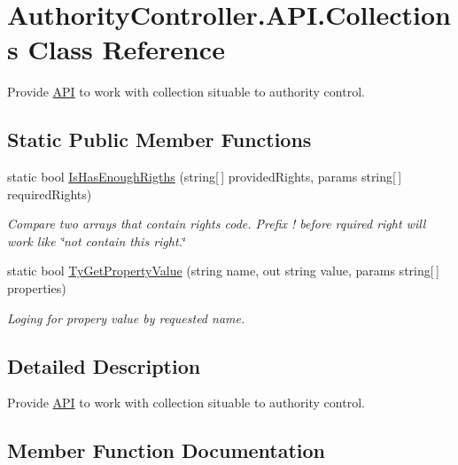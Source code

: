 \hypertarget{class_authority_controller_1_1_a_p_i_1_1_collections}{}\section{Authority\+Controller.\+A\+P\+I.\+Collections Class Reference}
\label{class_authority_controller_1_1_a_p_i_1_1_collections}


Provide \mbox{\hyperlink{namespace_authority_controller_1_1_a_p_i}{A\+PI}} to work with collection situable to authority control.  


\subsection*{Static Public Member Functions}
\begin{DoxyCompactItemize}
\item 
static bool \mbox{\hyperlink{class_authority_controller_1_1_a_p_i_1_1_collections_a7e292e3fb49b2b6f0fb1060a9beb2e9f}{Is\+Has\+Enough\+Rigths}} (string\mbox{[}$\,$\mbox{]} provided\+Rights, params string\mbox{[}$\,$\mbox{]} required\+Rights)
\begin{DoxyCompactList}\small\item\em Compare two arrays that contain rights code. Prefix \textquotesingle{}!\textquotesingle{} before rquired right will work like \char`\"{}not contain this right.\char`\"{} \end{DoxyCompactList}\item 
static bool \mbox{\hyperlink{class_authority_controller_1_1_a_p_i_1_1_collections_a65e8bd3790cb8576d37938f20dd792f4}{Ty\+Get\+Property\+Value}} (string name, out string value, params string\mbox{[}$\,$\mbox{]} properties)
\begin{DoxyCompactList}\small\item\em Loging for propery value by requested name. \end{DoxyCompactList}\end{DoxyCompactItemize}


\subsection{Detailed Description}
Provide \mbox{\hyperlink{namespace_authority_controller_1_1_a_p_i}{A\+PI}} to work with collection situable to authority control. 



\subsection{Member Function Documentation}
\mbox{\label{class_authority_controller_1_1_a_p_i_1_1_collections_a7e292e3fb49b2b6f0fb1060a9beb2e9f}} 
